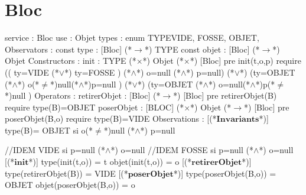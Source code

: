 \documentclass[a4paper, 11pt]{report}
\newcommand{\specB}[1]{\textbf{#1}}
\begin{document}
\section{Bloc}
\begin{Spe}
service : Bloc
use : Objet
types : enum TYPE{VIDE, FOSSE, OBJET},
Observators :
      const type : [Bloc] (*$\rightarrow$*) TYPE
      const objet : [Bloc] (*$\rightarrow$*) Objet
Constructors :
      init : TYPE (*$\times$*) Objet (*$\times$*) [Bloc]
            pre init(t,o,p) require 
            (( ty=VIDE (*$\lor$*) ty=FOSSE ) (*$\land$*) o=null (*$\land$*) p=null) 
            (*$\lor$*) (ty=OBJET (*$\land$*) o(*$\ne$*)null(*$\land$*)p=null ) 
            (*$\lor$*) (ty=OBJET (*$\land$*) o=null(*$\land$*)p(*$\ne$*)null )
Operators :
      retirerObjet : [Bloc] (*$\rightarrow$*) [Bloc]
            pre retirerObjet(B) require type(B)=OBJET 
      poserObjet : [BLOC] (*$\times$*) Objet (*$\rightarrow$*) [Bloc]
            pre poserObjet(B,o) require type(B)=VIDE 
Observations :
      [(*$\specB{Invariants}$*)]
            type(B)= OBJET si o(*$\ne$*)null (*$\land$*) p=null

            //IDEM VIDE si p=null (*$\land$*) o=null
            //IDEM FOSSE si p=null (*$\land$*) o=null
      [(*$\specB{init}$*)]
            type(init(t,o)) = t
            objet(init(t,o)) = o
      [(*$\specB{retirerObjet}$*)]
            type(retirerObjet(B)) = VIDE
      [(*$\specB{poserObjet}$*)] 
            type(poserObjet(B,o)) = OBJET
            objet(poserObjet(B,o)) = o 
     
\end{Spe}
 
\end{document}
